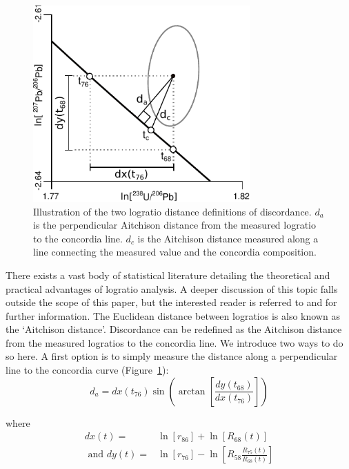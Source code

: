 \documentclass[gchron, manuscript]{copernicus}
\begin{document}
\begin{figure}
  \includegraphics[width=8.3cm]{Aitchison.pdf}
  \caption{Illustration of the two logratio distance definitions of
    discordance. $d_a$ is the perpendicular Aitchison distance from
    the measured logratio to the concordia line. $d_c$ is the
    Aitchison distance measured along a line connecting the measured
    value and the concordia composition.
  }
  \label{fig:aitchison}
\end{figure}

There exists a vast body of statistical literature detailing the
theoretical and practical advantages of logratio analysis. A deeper
discussion of this topic falls outside the scope of this paper, but
the interested reader is referred to \citet{aitchison1986} and
\citet{pawlowsky2015} for further information. The Euclidean distance
between logratios is also known as the `Aitchison distance'.
Discordance can be redefined as the Aitchison distance from the
measured logratios to the concordia line. We introduce two ways to do
so here.  A first option is to simply measure the distance along a
perpendicular line to the concordia curve
(Figure~\ref{fig:aitchison}):
\begin{equation}
  d_{a} = dx(t_{76})
  \sin\!\left(\arctan\!\left[ \frac{dy(t_{68})}{dx(t_{76})} \right]
  \right)
  \label{eq:dperp}
\end{equation}

\noindent where
\begin{equation}
\begin{split}
  dx(t)  = & \ln\!\left[r_{86}\right] + \ln\!\left[R_{68}(t)\right] \\
  \mbox{~and~}
  dy(t) = & \ln\!\left[r_{76}\right] -
  \ln\!\left[R_{58}\frac{R_{75}(t)}{R_{68}(t)}\right]
  \end{split}
\end{equation}
\end{document}
